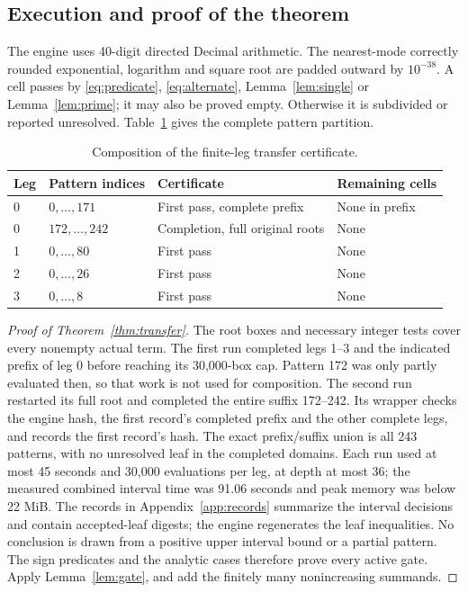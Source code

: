 \documentclass[11pt]{article}
\theoremstyle{remark}
\numberwithin{equation}{section}
\begin{document}
\subsection{Execution and proof of the theorem}

The engine uses 40-digit directed Decimal arithmetic. The nearest-mode
correctly rounded exponential, logarithm and square root are padded
outward by $10^{-38}$. A cell passes by \eqref{eq:predicate},
\eqref{eq:alternate}, Lemma~\ref{lem:single} or Lemma~\ref{lem:prime};
it may also be proved empty. Otherwise it is subdivided or reported
unresolved. Table~\ref{tab:cover} gives the complete pattern partition.

\begin{table}[htbp]
\centering
\begin{tabular}{llll}
\toprule
Leg & Pattern indices & Certificate & Remaining cells\\
\midrule
0 & $0,\ldots,171$ & First pass, complete prefix & None in prefix\\
0 & $172,\ldots,242$ & Completion, full original roots & None\\
1 & $0,\ldots,80$ & First pass & None\\
2 & $0,\ldots,26$ & First pass & None\\
3 & $0,\ldots,8$ & First pass & None\\
\bottomrule
\end{tabular}
\caption{Composition of the finite-leg transfer certificate.}
\label{tab:cover}
\end{table}

\begin{proof}[Proof of Theorem~\ref{thm:transfer}]
The root boxes and necessary integer tests cover every nonempty actual
term. The first run completed legs 1--3 and the indicated prefix of
leg 0 before reaching its 30,000-box cap. Pattern 172 was only partly
evaluated then, so that work is not used for composition. The second run
restarted its full root and completed the entire suffix 172--242.
Its wrapper checks the engine hash, the first record's completed prefix
and the other complete legs, and records the first record's hash.
The exact prefix/suffix union is all 243 patterns, with no unresolved
leaf in the completed domains. Each run used at most 45 seconds and
30,000 evaluations per leg, at depth at most 36; the measured combined
interval time was 91.06 seconds and peak memory was below 22 MiB.
The records in Appendix~\ref{app:records} summarize the interval
decisions and contain accepted-leaf digests; the engine regenerates the
leaf inequalities. No conclusion is drawn from a positive
upper interval bound or a partial pattern. The sign predicates and the
analytic cases therefore prove every active gate. Apply
Lemma~\ref{lem:gate}, and add the finitely many nonincreasing summands.
\end{proof}
\end{document}
